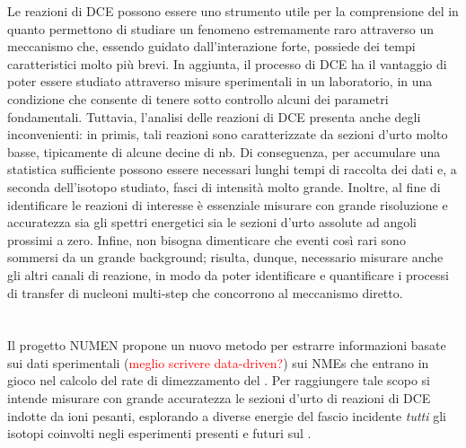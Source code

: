 Le reazioni di DCE possono essere uno strumento utile per la comprensione del \doppiobeta{} in quanto permettono di studiare un fenomeno estremamente raro attraverso un meccanismo che, essendo guidato dall'interazione forte, possiede dei tempi caratteristici molto più brevi. 
In aggiunta, il processo di DCE ha il vantaggio di poter essere studiato attraverso misure sperimentali in un laboratorio, in una condizione che consente di tenere sotto controllo alcuni dei parametri fondamentali.
Tuttavia, l'analisi delle reazioni di DCE presenta anche degli inconvenienti: in primis, tali reazioni sono caratterizzate da sezioni d'urto molto basse, tipicamente di alcune decine di nb.
Di conseguenza, per accumulare una statistica sufficiente possono essere necessari lunghi tempi di raccolta dei dati e, a seconda dell'isotopo studiato, fasci di intensità molto grande.
Inoltre, al fine di identificare le reazioni di interesse è essenziale misurare con grande risoluzione e accuratezza sia gli spettri energetici sia le sezioni d'urto assolute ad angoli prossimi a zero. 
Infine, non bisogna dimenticare che eventi così rari sono sommersi da un grande background; risulta, dunque, necessario misurare anche gli altri canali di reazione, in modo da poter identificare e quantificare i processi di transfer di nucleoni multi-step che concorrono al meccanismo diretto.




\section{} \label{sez:progetto_numen}

Il progetto NUMEN propone un nuovo metodo per estrarre informazioni basate sui dati sperimentali (\textcolor{red}{meglio scrivere data-driven?}) sui NMEs che entrano in gioco nel calcolo del rate di dimezzamento del \doppiobeta{}. 
Per raggiungere tale scopo si intende misurare con grande accuratezza le sezioni d'urto di reazioni di DCE indotte da ioni pesanti, esplorando a diverse energie del fascio incidente \emph{tutti} gli isotopi coinvolti negli esperimenti presenti e futuri sul \doppiobeta{}.

